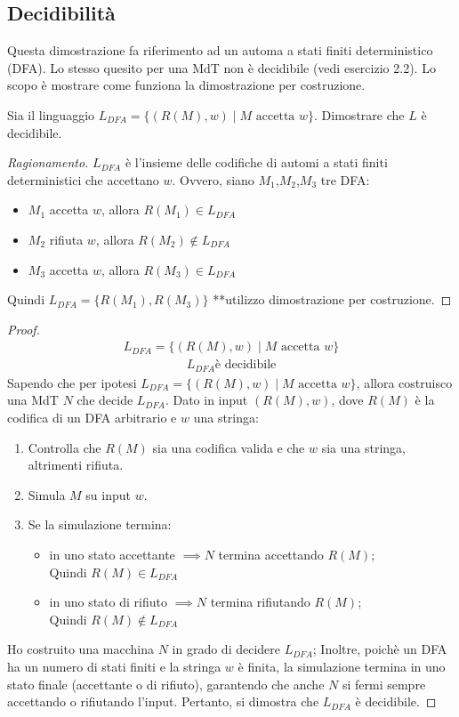 \documentclass{article}  %
\theoremstyle{definition}
\newenvironment{ragionamento}[1][]
  {\begin{proof}[Ragionamento#1]\renewcommand{\qedsymbol}{}\normalfont}
  {\end{proof}}
\begin{document}
\subsection{Decidibilità}
Questa dimostrazione fa riferimento ad un automa a stati finiti deterministico (DFA). Lo stesso quesito per una MdT non è decidibile (vedi esercizio 2.2).
Lo scopo è mostrare come funziona la dimostrazione per costruzione.
\begin{esercizio}[Esercizio 1.1]
\footnotesize %
Sia il linguaggio $L_{DFA} = \{(R(M), w) \mid M \text{ accetta } w\}$. Dimostrare che $L$ è decidibile.
\begin{ragionamento}
$L_{DFA}$ è l'insieme delle codifiche di automi a stati finiti deterministici che accettano $w$. Ovvero, siano $M_1$,$M_2$,$M_3$ tre DFA:
\begin{itemize}
  \item $M_1$ accetta $w$, allora $R(M_1) \in L_{DFA}$
  \item $M_2$ rifiuta $w$, allora $R(M_2) \notin L_{DFA}$
  \item $M_3$ accetta $w$, allora $R(M_3) \in L_{DFA}$
\end{itemize}
Quindi \(L_{DFA}=\{R(M_1),R(M_3)\}\) \newline
**utilizzo dimostrazione per costruzione.
\end{ragionamento}
\begin{proof}
\begin{align*}
  L_{DFA} = \{(R(M), w) \mid M \text{ accetta } w\} \tag*{(ipotesi)}
\end{align*}
\begin{align*}
  L_{DFA} \text{è decidibile} \tag*{(tesi)}
\end{align*}
  Sapendo che per ipotesi $L_{DFA} = \{(R(M), w) \mid M \text{ accetta } w\}$, allora costruisco una MdT $N$ che decide $L_{DFA}$.
  Dato in input $(R(M),w)$, dove $R(M)$ è la codifica di un DFA arbitrario e $w$ una stringa:
  \begin{enumerate}
    \item Controlla che $R(M)$ sia una codifica valida e che $w$ sia una stringa, altrimenti rifiuta.
    \item Simula $M$ su input $w$.
    \item Se la simulazione termina:
    \begin{itemize}
      \item in uno stato accettante $\implies N$ termina accettando $R(M)$; \\ Quindi $R(M) \in L_{DFA}$
      \item in uno stato di rifiuto $\implies N$ termina rifiutando $R(M)$; \\ Quindi $R(M) \notin L_{DFA}$
    \end{itemize}
  \end{enumerate}
  Ho costruito una macchina $N$ in grado di decidere $L_{DFA}$; Inoltre, poichè un DFA ha
  un numero di stati finiti e la stringa $w$ è finita, la simulazione termina in uno stato finale 
  (accettante o di rifiuto), garantendo che anche $N$ si fermi sempre accettando o rifiutando l'input. 
  Pertanto, si dimostra che $L_{DFA}$ è decidibile.
 \end{proof}
\end{esercizio}
\end{document}
